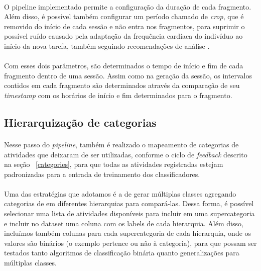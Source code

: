             \paragraph{} O pipeline implementado permite a configuração da duração de cada fragmento. Além disso, é possível também configurar um período chamado de \textit{crop}, que é removido do início de cada sessão e não entra nos fragmentos, para suprimir o possível ruído causado pela adaptação da frequência cardíaca do indivíduo ao início da nova tarefa, também seguindo recomendações de análise \cite{Quintana2016GuidelinesCommunication}. 
            
            \paragraph{} Com esses dois parâmetros, são determinados o tempo de início e fim de cada fragmento dentro de uma sessão. Assim como na geração da sessão, os intervalos contidos em cada fragmento são determinados através da comparação de seu \textit{timestamp} com os horários de início e fim determinados para o fragmento.
            
        \subsection{Hierarquização de categorias}
        
            \paragraph{} Nesse passo do \textit{pipeline}, também é realizado o mapeamento de categorias de atividades que deixaram de ser utilizadas, conforme o ciclo de \textit{feedback} descrito na seção ~\ref{categories}, para que todas as atividades registradas estejam padronizadas para a entrada de treinamento dos classificadores. 
            
            \paragraph{} Uma das estratégias que adotamos é a de gerar múltiplas classes agregando categorias de em diferentes hierarquias para compará-las. Dessa forma, é possível selecionar uma lista de atividades disponíveis para incluir em uma supercategoria e incluir no dataset uma coluna com os labels de cada hierarquia. Além disso, incluímos também colunas para cada supercategoria de cada hierarquia, onde os valores são binários (o exemplo pertence ou não à categoria), para que possam ser testados tanto algoritmos de classificação binária quanto generalizações para múltiplas classes.
            
